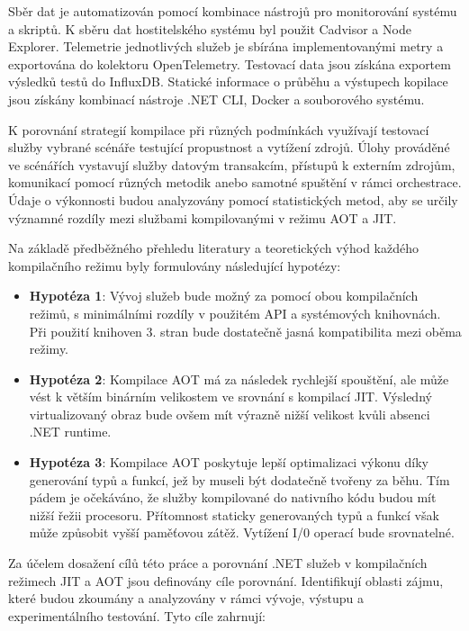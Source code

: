Sběr dat je automatizován pomocí kombinace nástrojů pro monitorování systému a skriptů. K sběru dat hostitelského systému byl použit Cadvisor a Node Explorer. Telemetrie jednotlivých služeb je sbírána implementovanými metry a exportována do kolektoru OpenTelemetry. Testovací data jsou získána exportem výsledků testů do InfluxDB. Statické informace o průběhu a výstupech kopilace jsou získány kombinací nástroje .NET CLI, Docker a souborového systému.

K porovnání strategií kompilace při různých podmínkách využívají testovací služby vybrané scénáře testující propustnost a vytížení zdrojů. Úlohy prováděné ve scénářích vystavují služby datovým transakcím, přístupů k externím zdrojům, komunikací pomocí různých metodik anebo samotné spuštění v rámci orchestrace. Údaje o výkonnosti budou analyzovány pomocí statistických metod, aby se určily významné rozdíly mezi službami kompilovanými v režimu AOT a JIT. 


Na základě předběžného přehledu literatury a teoretických výhod každého kompilačního režimu byly formulovány následující hypotézy:

\begin{itemize}
    \item \textbf{Hypotéza 1}: Vývoj služeb bude možný za pomocí obou kompilačních režimů, s minimálními rozdíly v použitém API a systémových knihovnách. Při použití knihoven 3. stran bude dostatečně jasná kompatibilita mezi oběma režimy.
    \item \textbf{Hypotéza 2}: Kompilace AOT má za následek rychlejší spouštění, ale může vést k větším binárním velikostem ve srovnání s kompilací JIT. Výsledný virtualizovaný obraz bude ovšem mít výrazně nižší velikost kvůli absenci .NET runtime.
    \item \textbf{Hypotéza 3}: Kompilace AOT poskytuje lepší optimalizaci výkonu díky generování typů a funkcí, jež by museli být dodatečně tvořeny za běhu. Tím pádem je očekáváno, že služby kompilované do nativního kódu budou mít nižší řežii procesoru. Přítomnost staticky generovaných typů a funkcí však může způsobit vyšší paměťovou zátěž. Vytížení I/0 operací bude srovnatelné.
\end{itemize}


Za účelem dosažení cílů této práce a porovnání .NET služeb v kompilačních režimech JIT a AOT jsou definovány cíle porovnání. Identifikují oblasti zájmu, které budou zkoumány a analyzovány v rámci vývoje, výstupu a experimentálního testování. Tyto cíle zahrnují:  

